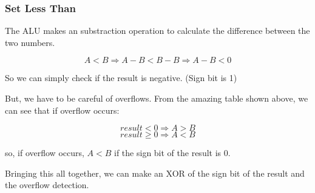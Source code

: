 \documentclass[11pt,a4paper]{article}
\begin{document}
\subsubsection*{Set Less Than}

The ALU makes an substraction operation to calculate the difference between the two numbers.

\[
    A < B \Rightarrow A - B < B - B \Rightarrow A - B < 0
\]

So we can simply check if the result is negative. (Sign bit is 1)

But, we have to be careful of overflows. From the amazing table shown above, we can see
that if overflow occurs:

\[
    result < 0 \Rightarrow A > B
\]
\[
    result \geq 0 \Rightarrow A < B
\]

so, if overflow occurs, $A < B$ if the sign bit of the result is 0.

Bringing this all together, we can make an XOR of the sign bit of the result and the overflow detection.

\end{document}
